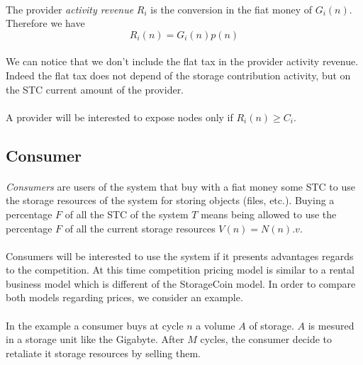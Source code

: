 \documentclass[a4paper,12pt]{article}
\begin{document}
\paragraph*{}
The provider \emph{activity revenue} $R_{i}$ is the conversion in the fiat money of $G_{i}(n)$. Therefore we have 
\[R_{i}(n)=G_{i}(n)p(n)\]

\paragraph*{}
We can notice that we don't include the flat tax in the provider activity revenue. Indeed the flat tax does not depend of the storage contribution activity, but on the STC current amount of the provider.

\paragraph*{}
A provider will be interested to expose nodes only if 
$R_{i}(n)\ge{C_{i}}$.

\subsection{Consumer}
\paragraph*{}
\emph{Consumers} are users of the system that buy with a fiat money some STC to use the storage resources of the system for storing objects (files, etc.). 
Buying a percentage $F$ of all the STC of the system $T$ means being allowed to use the percentage $F$ of all the current storage resources $V(n)=N(n).v$.

\paragraph*{}
Consumers will be interested to use the system if it presents advantages regards to the competition.
At this time competition pricing model is similar to a rental business model which is different of the StorageCoin model. 
In order to compare both models regarding prices, we consider an example.

\paragraph*{}
In the example a consumer buys at cycle $n$ a volume $A$ of storage. $A$ is mesured in a storage unit like the Gigabyte. After $M$ cycles, the consumer decide to retaliate it storage resources by selling them.
\end{document}
